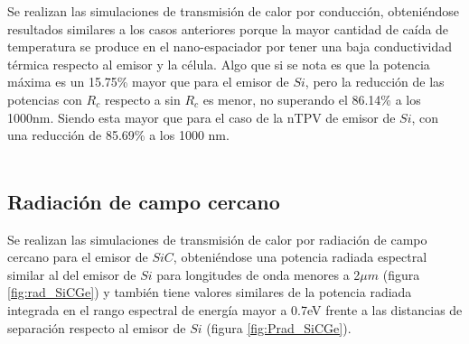 Se realizan las simulaciones de transmisión de calor por conducción, obteniéndose resultados similares a los casos anteriores porque la mayor cantidad de caída de temperatura se produce en el nano-espaciador por tener una baja conductividad térmica respecto al emisor y la célula. Algo que si se nota es que la potencia máxima es un 15.75\% mayor que para el emisor de $Si$, pero la reducción de las potencias con $R_c$ respecto a sin $R_c$ es menor, no superando el 86.14\% a los 1000nm. Siendo esta mayor que para el caso de la nTPV de emisor de $Si$, con una reducción de 85.69\% a los 1000 nm.\\\\
\subsection{Radiación de campo cercano}
Se realizan las simulaciones de transmisión de calor por radiación de campo cercano para el emisor de $SiC$, obteniéndose una potencia radiada espectral similar al del emisor de $Si$ para longitudes de onda menores a 2$\mu m$ (figura \ref{fig:rad_SiCGe}) y también tiene valores similares de la potencia radiada integrada en el rango espectral de energía mayor a 0.7eV frente a las distancias de separación respecto al emisor de $Si$ (figura \ref{fig:Prad_SiCGe}).
\graphicspath{ {./figuras/Resultados/radiacion} }
